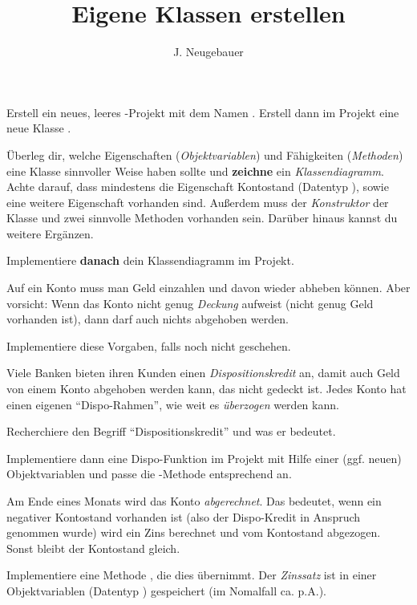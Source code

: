 \documentclass[10pt, a4paper]{scrartcl}
\author{J. Neugebauer}
\title{Eigene Klassen erstellen}
\date{\Heute}
\begin{document}
\ReiheTitel

\begin{aufgabe}
	Erstell ein neues, leeres -Projekt mit dem Namen . Erstell dann im Projekt eine neue Klasse .
\end{aufgabe}

\begin{aufgabe}
	Überleg dir, welche Eigenschaften (\emph{Objektvariablen}) und Fähigkeiten (\emph{Methoden}) eine Klasse  sinnvoller Weise haben sollte und \textbf{zeichne} ein \emph{Klassendiagramm}. Achte darauf, dass mindestens die Eigenschaft Kontostand (Datentyp ), sowie eine weitere Eigenschaft vorhanden sind. Außerdem muss der \emph{Konstruktor} der Klasse und zwei sinnvolle Methoden vorhanden sein. Darüber hinaus kannst du weitere Ergänzen.
	
	Implementiere \textbf{danach} dein Klassendiagramm im Projekt.
\end{aufgabe}

\begin{aufgabe}
	Auf ein Konto muss man Geld einzahlen und davon wieder abheben können. Aber vorsicht: Wenn das Konto nicht genug \emph{Deckung} aufweist (nicht genug Geld vorhanden ist), dann darf auch nichts abgehoben werden.
	
	Implementiere diese Vorgaben, falls noch nicht geschehen.
\end{aufgabe}

\begin{aufgabe}
	Viele Banken bieten ihren Kunden einen \emph{Dispositionskredit} an, damit auch Geld von einem Konto abgehoben werden kann, das nicht gedeckt ist. Jedes Konto hat einen eigenen \enquote{Dispo-Rahmen}, wie weit es \emph{überzogen} werden kann.
	
	Recherchiere den Begriff \enquote{Dispositionskredit} und was er bedeutet.

	Implementiere dann eine Dispo-Funktion im Projekt mit Hilfe einer (ggf. neuen) Objektvariablen  und passe die -Methode entsprechend an.
\end{aufgabe}

\begin{aufgabe}
	Am Ende eines Monats wird das Konto \emph{abgerechnet}. Das bedeutet, wenn ein negativer Kontostand vorhanden ist (also der Dispo-Kredit in Anspruch genommen wurde) wird ein Zins berechnet und vom Kontostand abgezogen. Sonst bleibt der Kontostand gleich.
	
	Implementiere eine Methode , die dies übernimmt. Der \emph{Zinssatz} ist in einer Objektvariablen (Datentyp ) gespeichert (im Nomalfall ca.  p.A.).
\end{aufgabe}
\end{document}
